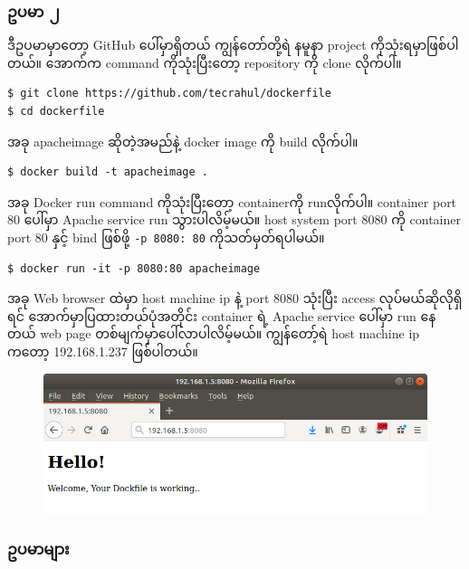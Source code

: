 \documentclass{article}
\begin{document}
\subsubsection{ဥပမာ ၂}\label{ux1025ux1015ux1019-1}

ဒီဥပမာမှာတော့ GitHub ပေါ်မှာရှိတယ် ကျွန်တော်တို့ရဲ နမူနာ project
ကိုသုံးရမှာဖြစ်ပါတယ်။ အောက်က command ကိုသုံးပြီးတော့ repository ကို
clone လိုက်ပါ။

\begin{verbatim}
$ git clone https://github.com/tecrahul/dockerfile
$ cd dockerfile
\end{verbatim}

အခု apacheimage ဆိုတဲ့အမည်နဲ့ docker image ကို build လိုက်ပါ။

\begin{verbatim}
$ docker build -t apacheimage .
\end{verbatim}

အခု Docker run command ကိုသုံးပြီး‌တော့ containerကို runလိုက်ပါ။
container port 80 ပေါ်မှာ Apache service run သွားပါလိမ့်မယ်။ host system
port 8080 ကို container port 80 နှင့် bind ဖြစ်ဖို့ \texttt{-p 8080: 80}
ကိုသတ်မှတ်ရပါမယ်။

\begin{verbatim}
$ docker run -it -p 8080:80 apacheimage
\end{verbatim}

အခု Web browser ထဲမှာ host machine ip နဲ့ port 8080 သုံးပြီး access
လုပ်မယ်ဆိုလိုရှိရင် အောက်မှာပြထားတယ်ပုံအတိုင်း container ရဲ့ Apache
service ပေါ်မှာ run နေတယ် web page တစ်မျက်မှာပေါ်လာပါလိမ့်မယ်။
ကျွန်တော့်ရဲ host machine ip ကတော့ 192.168.1.237 ဖြစ်ပါတယ်။

\begin{figure}[htbp]
\centering
\includegraphics[width=0.70\paperwidth]{.gitbook/assets/docker_file_and_docker_port.png}
\end{figure}

\subsubsection{ဥပမာများ}\label{ux1025ux1015ux1019ux1019}
\end{document}
